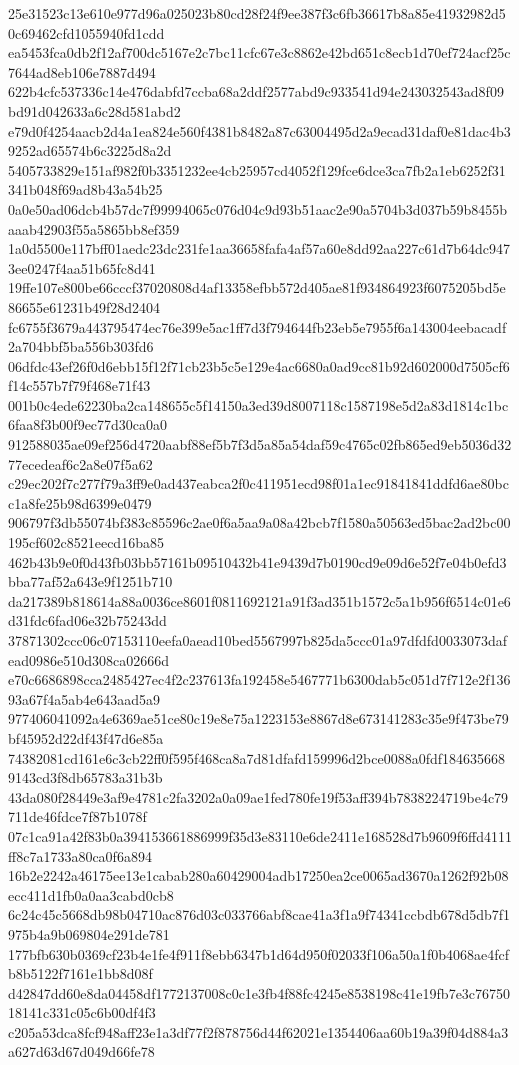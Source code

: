 {25e31523c13e610e977d96a025023b80cd28f24f9ee387f3c6fb36617b8a85e41932982d50c69462cfd1055940fd1cdd
ea5453fca0db2f12af700dc5167e2c7bc11cfc67e3c8862e42bd651c8ecb1d70ef724acf25c7644ad8eb106e7887d494
622b4cfc537336c14e476dabfd7ccba68a2ddf2577abd9c933541d94e243032543ad8f09bd91d042633a6c28d581abd2
e79d0f4254aacb2d4a1ea824e560f4381b8482a87c63004495d2a9ecad31daf0e81dac4b39252ad65574b6c3225d8a2d
5405733829e151af982f0b3351232ee4cb25957cd4052f129fce6dce3ca7fb2a1eb6252f31341b048f69ad8b43a54b25
0a0e50ad06dcb4b57dc7f99994065c076d04c9d93b51aac2e90a5704b3d037b59b8455baaab42903f55a5865bb8ef359
1a0d5500e117bff01aedc23dc231fe1aa36658fafa4af57a60e8dd92aa227c61d7b64dc9473ee0247f4aa51b65fc8d41
19ffe107e800be66cccf37020808d4af13358efbb572d405ae81f934864923f6075205bd5e86655e61231b49f28d2404
fc6755f3679a443795474ec76e399e5ac1ff7d3f794644fb23eb5e7955f6a143004eebacadf2a704bbf5ba556b303fd6
06dfdc43ef26f0d6ebb15f12f71cb23b5c5e129e4ac6680a0ad9cc81b92d602000d7505cf6f14c557b7f79f468e71f43
001b0c4ede62230ba2ca148655c5f14150a3ed39d8007118c1587198e5d2a83d1814c1bc6faa8f3b00f9ec77d30ca0a0
912588035ae09ef256d4720aabf88ef5b7f3d5a85a54daf59c4765c02fb865ed9eb5036d3277ecedeaf6c2a8e07f5a62
c29ec202f7c277f79a3ff9e0ad437eabca2f0c411951ecd98f01a1ec91841841ddfd6ae80bcc1a8fe25b98d6399e0479
906797f3db55074bf383c85596c2ae0f6a5aa9a08a42bcb7f1580a50563ed5bac2ad2bc00195cf602c8521eecd16ba85
462b43b9e0f0d43fb03bb57161b09510432b41e9439d7b0190cd9e09d6e52f7e04b0efd3bba77af52a643e9f1251b710
da217389b818614a88a0036ce8601f0811692121a91f3ad351b1572c5a1b956f6514c01e6d31fdc6fad06e32b75243dd
37871302ccc06c07153110eefa0aead10bed5567997b825da5ccc01a97dfdfd0033073dafead0986e510d308ca02666d
e70c6686898cca2485427ec4f2c237613fa192458e5467771b6300dab5c051d7f712e2f13693a67f4a5ab4e643aad5a9
977406041092a4e6369ae51ce80c19e8e75a1223153e8867d8e673141283c35e9f473be79bf45952d22df43f47d6e85a
74382081cd161e6c3cb22ff0f595f468ca8a7d81dfafd159996d2bce0088a0fdf1846356689143cd3f8db65783a31b3b
43da080f28449e3af9e4781c2fa3202a0a09ae1fed780fe19f53aff394b7838224719be4c79711de46fdce7f87b1078f
07c1ca91a42f83b0a394153661886999f35d3e83110e6de2411e168528d7b9609f6ffd4111ff8c7a1733a80ca0f6a894
16b2e2242a46175ee13e1cabab280a60429004adb17250ea2ce0065ad3670a1262f92b08ecc411d1fb0a0aa3cabd0cb8
6c24c45c5668db98b04710ac876d03c033766abf8cae41a3f1a9f74341ccbdb678d5db7f1975b4a9b069804e291de781
177bfb630b0369cf23b4e1fe4f911f8ebb6347b1d64d950f02033f106a50a1f0b4068ae4fcfb8b5122f7161e1bb8d08f
d42847dd60e8da04458df1772137008c0c1e3fb4f88fc4245e8538198c41e19fb7e3c7675018141c331c05c6b00df4f3
c205a53dca8fcf948aff23e1a3df77f2f878756d44f62021e1354406aa60b19a39f04d884a3a627d63d67d049d66fe78
}

